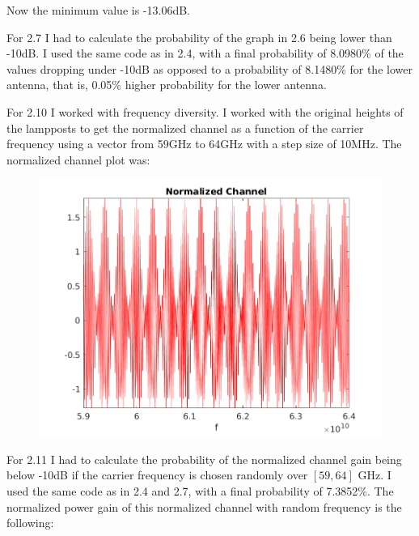 \documentclass[a4paper,11pt]{article}
\begin{document}
Now the minimum value is -13.06dB.

\bigskip

For 2.7 I had to calculate the probability of the graph in 2.6 being lower than
-10dB. I used the same code as in 2.4, with a final probability of 8.0980\% of the
values dropping under -10dB as opposed to a probability of 8.1480\% for the lower
antenna, that is, 0.05\% higher probability for the lower antenna.

\bigskip

For 2.10 I worked with frequency diversity. I worked with the original heights
of the lampposts to get the normalized channel as a function of the carrier frequency
using a vector from 59GHz to 64GHz with a step size of 10MHz. The normalized channel
plot was:

\begin{figure}[!ht]
	\centering
	\includegraphics[scale = 0.7]{images/2_10.png}
\end{figure}

For 2.11 I had to calculate the probability of the normalized channel gain
being below -10dB if the carrier frequency is chosen randomly over $[59, 64]$ GHz.
I used the same code as in 2.4 and 2.7, with a final probability of 7.3852\%.
The normalized power gain of this normalized channel with random frequency is the
following:
\end{document}
